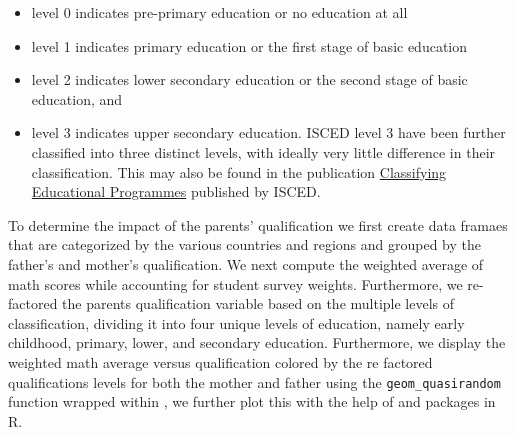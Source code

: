 \begin{itemize}
\tightlist
\item
  level 0 indicates pre-primary education or no education at all
\item
  level 1 indicates primary education or the first stage of basic
  education
\item
  level 2 indicates lower secondary education or the second stage of
  basic education, and
\item
  level 3 indicates upper secondary education. ISCED level 3 have been
  further classified into three distinct levels, with ideally very
  little difference in their classification. This may also be found in
  the publication
  \href{https://www.oecd.org/education/1841854.pdf}{Classifying
  Educational Programmes} \citep{isced} published by ISCED.
\end{itemize}

To determine the impact of the parents' qualification we first create
data framaes that are categorized by the various countries and regions
and grouped by the father's and mother's qualification. We next compute
the weighted average of math scores while accounting for student survey
weights. Furthermore, we re-factored the parents qualification variable
based on the multiple levels of classification, dividing it into four
unique levels of education, namely early childhood, primary, lower, and
secondary education. Furthermore, we display the weighted math average
versus qualification colored by the re factored qualifications levels
for both the mother and father using the \texttt{geom\_quasirandom}
function wrapped within  \citep{ggplot2}, we further
plot this with the help of  \citep{viridis} and
 \citep{patchwork} packages in R.

